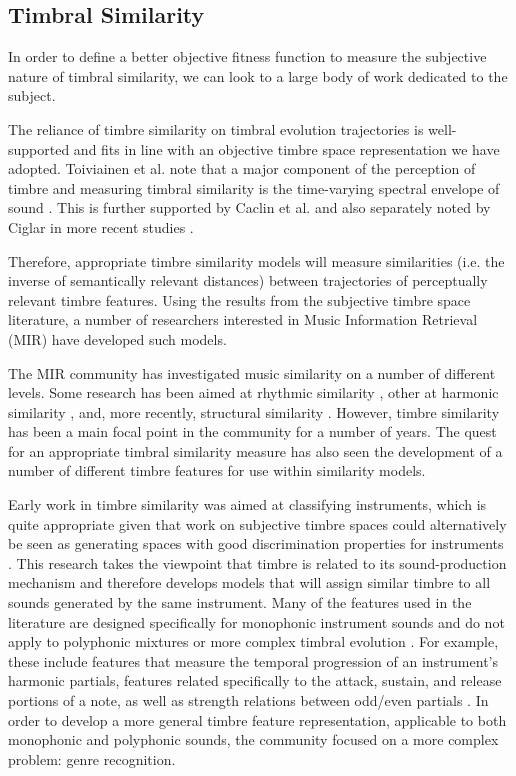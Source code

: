 \documentclass[a4paper,12pt]{report} 	%
\numberwithin{figure}{chapter}
\numberwithin{table}{chapter}
\numberwithin{equation}{chapter}
\begin{document}
\begin{flushleft}
\section{Timbral Similarity}

In order to define a better objective fitness function to measure the subjective nature of timbral similarity, we can look to a large body of work dedicated to the subject. 

The reliance of timbre similarity on timbral evolution trajectories is well-supported and fits in line with an objective timbre space representation we have adopted. Toiviainen et al. note that a major component of the perception of timbre and measuring timbral similarity is the time-varying spectral envelope of sound \cite[p.225]{Toiviainen:1998hs}. This is further supported by Caclin et al. and also separately noted by Ciglar in more recent studies \cite[p. 1]{Caclin:2005il} \cite[p. 4]{Ciglar:2009uf}. 

Therefore, appropriate timbre similarity models will measure similarities (i.e. the inverse of semantically relevant distances) between trajectories of perceptually relevant timbre features. Using the results from the subjective timbre space literature, a number of researchers interested in Music Information Retrieval (MIR) have developed such models.

The MIR community has investigated music similarity on a number of different levels. Some research has been aimed at rhythmic similarity \cite{Paulus:2002ec}, other at harmonic similarity \cite{Haas:2009mw}, and, more recently, structural similarity \cite{Bello:NoRead}. However, timbre similarity has been a main focal point in the community for a number of years. The quest for an appropriate timbral similarity measure has also seen the development of a number of different timbre features for use within similarity models. 

Early work in timbre similarity was aimed at classifying instruments, which is quite appropriate given that work on subjective timbre spaces could alternatively be seen as generating spaces with good discrimination properties for instruments \cite{Loureiro:2000wq, Park:2004fv, Timoney:2004ff, Zhang:2006jo}. This research takes the viewpoint that timbre is related to its sound-production mechanism and therefore develops models that will assign similar timbre to all sounds generated by the same instrument. Many of the features used in the literature are designed specifically for monophonic instrument sounds and do not apply to polyphonic mixtures or more complex timbral evolution \cite[p. 6]{Ciglar:2009uf}. For example, these include features that measure the temporal progression of an instrument's harmonic partials, features related specifically to the attack, sustain, and release portions of a note, as well as strength relations between odd/even partials \cite[p. 182]{Timoney:2004ff}. In order to develop a more general timbre feature representation, applicable to both monophonic and polyphonic sounds, the community focused on a more complex problem: genre recognition.


\end{flushleft}
\end{document}
